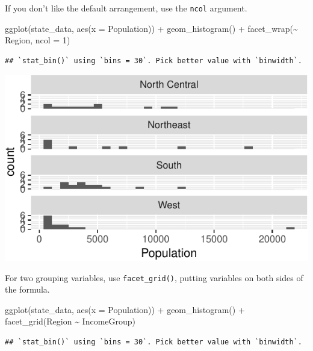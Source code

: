 \documentclass[
  12pt,
  oneside,openany]{book}
\newenvironment{Shaded}{\begin{snugshade}}{\end{snugshade}}
\newcommand{\AttributeTok}[1]{\textcolor[rgb]{0.77,0.63,0.00}{#1}}
\newcommand{\DecValTok}[1]{\textcolor[rgb]{0.00,0.00,0.81}{#1}}
\newcommand{\FunctionTok}[1]{\textcolor[rgb]{0.00,0.00,0.00}{#1}}
\newcommand{\NormalTok}[1]{#1}
\newcommand{\SpecialCharTok}[1]{\textcolor[rgb]{0.00,0.00,0.00}{#1}}
\begin{document}
If you don't like the default arrangement, use the \texttt{ncol} argument.

\begin{Shaded}
\begin{Highlighting}[]
\FunctionTok{ggplot}\NormalTok{(state\_data, }\FunctionTok{aes}\NormalTok{(}\AttributeTok{x =}\NormalTok{ Population)) }\SpecialCharTok{+}
  \FunctionTok{geom\_histogram}\NormalTok{() }\SpecialCharTok{+}
  \FunctionTok{facet\_wrap}\NormalTok{(}\SpecialCharTok{\textasciitilde{}}\NormalTok{ Region, }\AttributeTok{ncol =} \DecValTok{1}\NormalTok{)}
\end{Highlighting}
\end{Shaded}

\begin{verbatim}
## `stat_bin()` using `bins = 30`. Pick better value with `binwidth`.
\end{verbatim}

\includegraphics{pdaps_files/figure-latex/facet-wrap-ncol-1.pdf}

For two grouping variables, use \texttt{facet\_grid()}, putting variables on both sides of the formula.

\begin{Shaded}
\begin{Highlighting}[]
\FunctionTok{ggplot}\NormalTok{(state\_data, }\FunctionTok{aes}\NormalTok{(}\AttributeTok{x =}\NormalTok{ Population)) }\SpecialCharTok{+}
  \FunctionTok{geom\_histogram}\NormalTok{() }\SpecialCharTok{+}
  \FunctionTok{facet\_grid}\NormalTok{(Region }\SpecialCharTok{\textasciitilde{}}\NormalTok{ IncomeGroup)}
\end{Highlighting}
\end{Shaded}

\begin{verbatim}
## `stat_bin()` using `bins = 30`. Pick better value with `binwidth`.
\end{verbatim}
\end{document}
